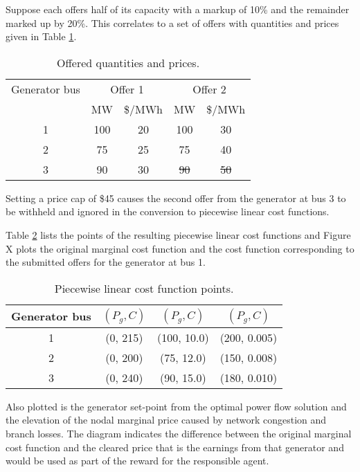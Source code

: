 Suppose each offers half of its capacity with a markup of 10\% and the
remainder marked up by 20\%.  This correlates to a set of offers with
quantities and prices given in Table \ref{tbl:ex_offers}.
\begin{table}
\begin{center}
\begin{tabular}{c|cc|cc}
\hline
Generator bus & \multicolumn{2}{c}{Offer 1} & \multicolumn{2}{|c}{Offer 2}\\
 & MW & \$/MWh & MW & \$/MWh \\
\hline
1 & 100 & 20 & 100 & 30 \\
2 & 75  & 25 & 75  & 40 \\
3 & 90  & 30 & \sout{90}  & \sout{50} \\
\hline
\end{tabular}
\end{center}
\caption{Offered quantities and prices.}
\label{tbl:ex_offers}
\end{table}
Setting a price
cap of \$45 causes the second offer from the generator at bus 3 to be withheld
and ignored in the conversion to piecewise linear cost functions.

Table
\ref{tbl:ex_pwl} lists the points of the resulting piecewise linear cost
functions and Figure X plots the original marginal cost function and the cost
function corresponding to the submitted offers for the generator at bus 1.
\begin{table}
\begin{center}
\begin{tabular}{c|c|c|c}
\hline
Generator bus & $(P_g, C)$ & $(P_g, C)$ & $(P_g, C)$ \\
\hline
1 & (0, 215) & (100, 10.0) & (200, 0.005) \\
2 & (0, 200) & (75, 12.0) & (150, 0.008) \\
3 & (0, 240) & (90, 15.0) & (180, 0.010) \\
\hline
\end{tabular}
\end{center}
\caption{Piecewise linear cost function points.}
\label{tbl:ex_pwl}
\end{table}
Also plotted is the generator set-point from the optimal power flow
solution and the elevation of the nodal marginal price caused by network
congestion and branch losses.  The diagram indicates the difference between the
original marginal cost function and the cleared price that is the earnings from
that generator and would be used as part of the reward for the responsible
agent.

